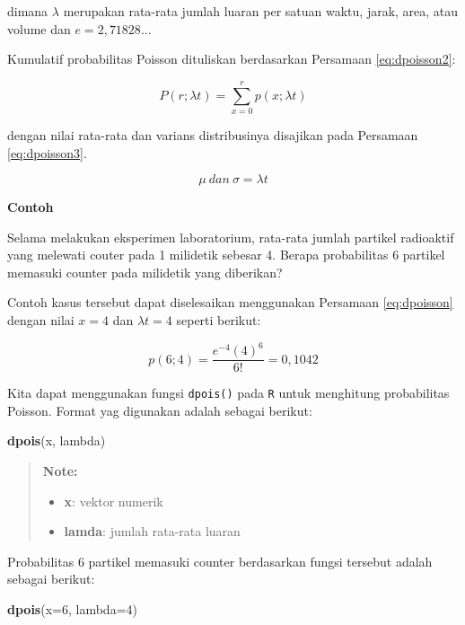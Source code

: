 \documentclass[]{book}
\newenvironment{Shaded}{\begin{snugshade}}{\end{snugshade}}
\newcommand{\KeywordTok}[1]{\textcolor[rgb]{0.13,0.29,0.53}{\textbf{#1}}}
\newcommand{\DataTypeTok}[1]{\textcolor[rgb]{0.13,0.29,0.53}{#1}}
\newcommand{\DecValTok}[1]{\textcolor[rgb]{0.00,0.00,0.81}{#1}}
\newcommand{\NormalTok}[1]{#1}
\providecommand{\tightlist}{%
  \setlength{\itemsep}{0pt}\setlength{\parskip}{0pt}}
\begin{document}
dimana \(\lambda\) merupakan rata-rata jumlah luaran per satuan waktu,
jarak, area, atau volume dan \(e=2,71828...\)

Kumulatif probabilitas Poisson dituliskan berdasarkan Persamaan
\eqref{eq:dpoisson2}:

\begin{equation}
   P\left(r;\lambda t\right)=\sum_{x=0}^rp\left(x;\lambda t\right)
  \label{eq:dpoisson2}
\end{equation}

dengan nilai rata-rata dan varians distribusinya disajikan pada
Persamaan \eqref{eq:dpoisson3}.

\begin{equation}
   \mu\ dan\ \sigma=\lambda t
  \label{eq:dpoisson3}
\end{equation}

\textbf{Contoh}

Selama melakukan eksperimen laboratorium, rata-rata jumlah partikel
radioaktif yang melewati couter pada 1 milidetik sebesar 4. Berapa
probabilitas 6 partikel memasuki counter pada milidetik yang diberikan?

Contoh kasus tersebut dapat diselesaikan menggunakan Persamaan
\eqref{eq:dpoisson} dengan nilai \(x=4\) dan \(\lambda t=4\) seperti
berikut:

\[
p\left(6;4\right)=\frac{e^{-4}\left(4\right)^6}{6!}=0,1042
\]

Kita dapat menggunakan fungsi \texttt{dpois()} pada \texttt{R} untuk
menghitung probabilitas Poisson. Format yag digunakan adalah sebagai
berikut:

\begin{Shaded}
\begin{Highlighting}[]
\KeywordTok{dpois}\NormalTok{(x, lambda)}
\end{Highlighting}
\end{Shaded}

\begin{quote}
\textbf{Note: }

\begin{itemize}
\tightlist
\item
  \textbf{x}: vektor numerik
\item
  \textbf{lamda}: jumlah rata-rata luaran
\end{itemize}
\end{quote}

Probabilitas 6 partikel memasuki counter berdasarkan fungsi tersebut
adalah sebagai berikut:

\begin{Shaded}
\begin{Highlighting}[]
\KeywordTok{dpois}\NormalTok{(}\DataTypeTok{x=}\DecValTok{6}\NormalTok{, }\DataTypeTok{lambda=}\DecValTok{4}\NormalTok{)}
\end{Highlighting}
\end{Shaded}
\end{document}

